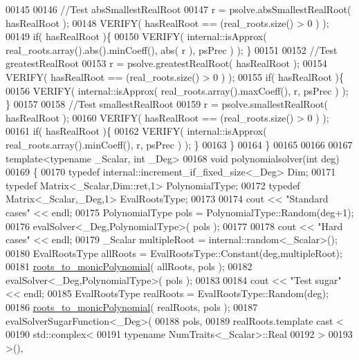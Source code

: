 \begin{DoxyCode}
00145 
00146     \textcolor{comment}{//Test absSmallestRealRoot}
00147     r = psolve.absSmallestRealRoot( hasRealRoot );
00148     VERIFY( hasRealRoot == (real\_roots.size() > 0 ) );
00149     \textcolor{keywordflow}{if}( hasRealRoot )\{
00150       VERIFY( internal::isApprox( real\_roots.array().abs().minCoeff(), abs( r ), psPrec ) ); \}
00151 
00152     \textcolor{comment}{//Test greatestRealRoot}
00153     r = psolve.greatestRealRoot( hasRealRoot );
00154     VERIFY( hasRealRoot == (real\_roots.size() > 0 ) );
00155     \textcolor{keywordflow}{if}( hasRealRoot )\{
00156       VERIFY( internal::isApprox( real\_roots.array().maxCoeff(), r, psPrec ) ); \}
00157 
00158     \textcolor{comment}{//Test smallestRealRoot}
00159     r = psolve.smallestRealRoot( hasRealRoot );
00160     VERIFY( hasRealRoot == (real\_roots.size() > 0 ) );
00161     \textcolor{keywordflow}{if}( hasRealRoot )\{
00162     VERIFY( internal::isApprox( real\_roots.array().minCoeff(), r, psPrec ) ); \}
00163   \}
00164 \}
00165 
00166 
00167 \textcolor{keyword}{template}<\textcolor{keyword}{typename} \_Scalar, \textcolor{keywordtype}{int} \_Deg>
00168 \textcolor{keywordtype}{void} polynomialsolver(\textcolor{keywordtype}{int} deg)
00169 \{
00170   \textcolor{keyword}{typedef} internal::increment\_if\_fixed\_size<\_Deg>            Dim;
00171   \textcolor{keyword}{typedef} Matrix<\_Scalar,Dim::ret,1>                  PolynomialType;
00172   \textcolor{keyword}{typedef} Matrix<\_Scalar,\_Deg,1>                      EvalRootsType;
00173 
00174   cout << \textcolor{stringliteral}{"Standard cases"} << endl;
00175   PolynomialType pols = PolynomialType::Random(deg+1);
00176   evalSolver<\_Deg,PolynomialType>( pols );
00177 
00178   cout << \textcolor{stringliteral}{"Hard cases"} << endl;
00179   \_Scalar multipleRoot = internal::random<\_Scalar>();
00180   EvalRootsType allRoots = EvalRootsType::Constant(deg,multipleRoot);
00181   \hyperlink{namespace_eigen_afbc3648f7ef67db3d5d04454fc1257fd}{roots\_to\_monicPolynomial}( allRoots, pols );
00182   evalSolver<\_Deg,PolynomialType>( pols );
00183 
00184   cout << \textcolor{stringliteral}{"Test sugar"} << endl;
00185   EvalRootsType realRoots = EvalRootsType::Random(deg);
00186   \hyperlink{namespace_eigen_afbc3648f7ef67db3d5d04454fc1257fd}{roots\_to\_monicPolynomial}( realRoots, pols );
00187   evalSolverSugarFunction<\_Deg>(
00188       pols,
00189       realRoots.template cast <
00190                     std::complex<
00191                          \textcolor{keyword}{typename} NumTraits<\_Scalar>::Real
00192                          >
00193                     >(),

\end{DoxyCode}
